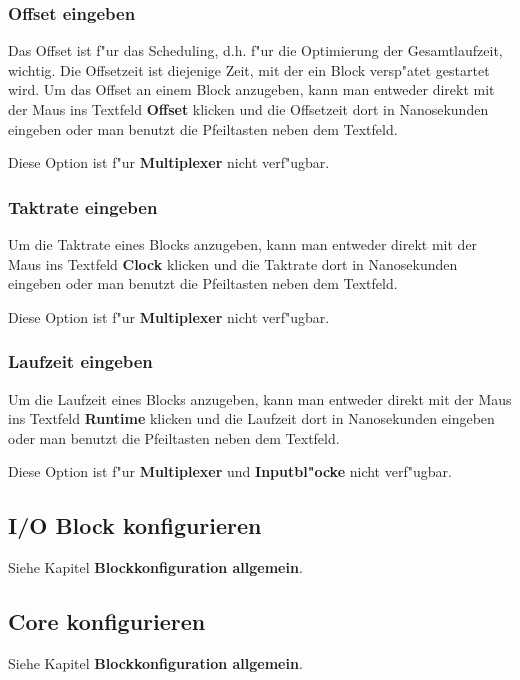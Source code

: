 \documentclass[a4paper,titlepage,12pt,ngerman]{scrbook}
\begin{document}
\subsubsection{Offset eingeben}
Das Offset ist f"ur das Scheduling, d.h. f"ur die Optimierung der Gesamtlaufzeit, wichtig. Die Offsetzeit ist diejenige Zeit, mit der ein Block versp"atet gestartet wird.
Um das Offset an einem Block anzugeben, kann man entweder direkt mit der Maus ins Textfeld {\bf Offset} klicken und die Offsetzeit dort in Nanosekunden eingeben oder man benutzt die Pfeiltasten neben dem Textfeld.\par
Diese Option ist f"ur {\bf Multiplexer} nicht verf"ugbar.
\subsubsection{Taktrate eingeben}
Um die Taktrate eines Blocks anzugeben, kann man entweder direkt mit der Maus ins Textfeld {\bf Clock} klicken und die Taktrate dort in Nanosekunden eingeben oder man benutzt die Pfeiltasten neben dem Textfeld.\par
Diese Option ist f"ur {\bf Multiplexer} nicht verf"ugbar.
\subsubsection{Laufzeit eingeben}
Um die Laufzeit eines Blocks anzugeben, kann man entweder direkt mit der Maus ins Textfeld {\bf Runtime} klicken und die Laufzeit dort in Nanosekunden eingeben oder man benutzt die Pfeiltasten neben dem Textfeld.\par
Diese Option ist f"ur {\bf Multiplexer} und {\bf Inputbl"ocke} nicht verf"ugbar.


\subsection{I/O Block konfigurieren}
Siehe Kapitel {\bf Blockkonfiguration allgemein}.



\subsection{Core konfigurieren}
Siehe Kapitel {\bf Blockkonfiguration allgemein}.
\end{document}
